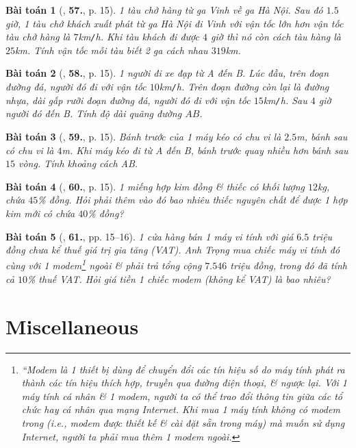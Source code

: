 \documentclass{article}
\numberwithin{equation}{section}
\newtheorem{baitoan}{Bài toán}
\begin{document}
\begin{baitoan}[\cite{SBT_Toan_8_tap_2}, \textbf{57.}, p. 15]
	1 tàu chở hàng từ ga Vinh về ga Hà Nội. Sau đó $1.5$ giờ, 1 tàu chở khách xuất phát từ ga Hà Nội đi Vinh với vận tốc lớn hơn vận tốc tàu chở hàng là $7$\emph{km\texttt{/}h}. Khi tàu khách đi được $4$ giờ thì nó còn cách tàu hàng là $25$\emph{km}. Tính vận tốc mỗi tàu biết 2 ga cách nhau $319$\emph{km}.
\end{baitoan}

\begin{baitoan}[\cite{SBT_Toan_8_tap_2}, \textbf{58.}, p. 15]
	1 người đi xe đạp từ A đến B. Lúc đầu, trên đoạn đường đá, người đó đi với vận tốc $10$\emph{km\texttt{/}h}. Trên đoạn đường còn lại là đường nhựa, dài gấp rưỡi đoạn đường đá, người đó đi với vận tốc $15$\emph{km\texttt{/}h}. Sau $4$ giờ người đó đến B. Tính độ dài quãng đường $AB$.
\end{baitoan}

\begin{baitoan}[\cite{SBT_Toan_8_tap_2}, \textbf{59.}, p. 15]
	Bánh trước của 1 máy kéo có chu vi là $2.5$\emph{m}, bánh sau có chu vi là $4$\emph{m}. Khi máy kéo đi từ A đến B, bánh trước quay nhiều hơn bánh sau $15$ vòng. Tính khoảng cách AB.
\end{baitoan}

\begin{baitoan}[\cite{SBT_Toan_8_tap_2}, \textbf{60.}, p. 15]
	1 miếng hợp kim đồng \& thiếc có khối lượng $12$\emph{kg}, chứa $45$\% đồng. Hỏi phải thêm vào đó bao nhiêu thiếc nguyên chất để được 1 hợp kim mới có chứa $40$\% đồng?
\end{baitoan}

\begin{baitoan}[\cite{SBT_Toan_8_tap_2}, \textbf{61.}, pp. 15--16]
	1 cửa hàng bán 1 máy vi tính với giá $6.5$ triệu đồng chưa kể thuế giá trị gia tăng (VAT). Anh Trọng mua chiếc máy vi tính đó cùng với 1 modem\footnote{``Modem là 1 thiết bị dùng để chuyển đổi các tín hiệu số do máy tính phát ra thành các tín hiệu thích hợp, truyền qua đường điện thoại, \& ngược lại. Với 1 máy tính cá nhân \& 1 modem, người ta có thể trao đổi thông tin giữa các tổ chức hay cá nhân qua mạng Internet. Khi mua 1 máy tính không có modem trong (i.e., modem được thiết kế \& cài đặt sẵn trong máy) mà muốn sử dụng Internet, người ta phải mua thêm 1 modem ngoài.} ngoài \& phải trả tổng cộng $7.546$ triệu đồng, trong đó đã tính cả $10$\% thuế VAT. Hỏi giá tiền 1 chiếc modem (không kể VAT) là bao nhiêu?
\end{baitoan}


\section{Miscellaneous}


\printbibliography[heading=bibintoc]
	
\end{document}
